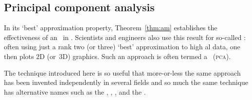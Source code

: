 


\subsection{Principal component analysis}
\label{sec:pca}


In its `best' approximation property, Theorem~\ref{thm:am} establishes the effectiveness of an \svd\ in .
Scientists and engineers also use this result for so-called : often using just a rank two (or three) `best' approximation to high al data, one then plots 2D (or~3D) graphics.
Such an approach is often termed a ~(\textsc{pca}).

The technique introduced here is so useful that more-or-less the same approach has been invented independently in several fields and so much the same technique has alternative names such as the , , , and the .


\begin{comment}
 \cite[\S8.4]{Chartier2015}
\end{comment}




